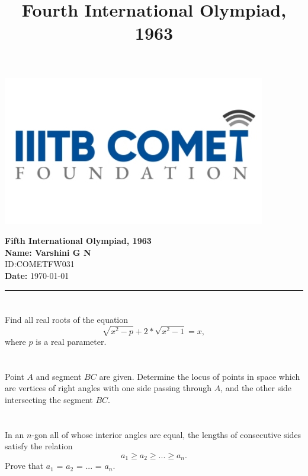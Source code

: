 \documentclass[12pt,a4paper]{article}
\begin{document}
\begin{center}
\begin{minipage}{0.2\textwidth}
  \includegraphics[width=\linewidth]{iiit_logo.png}
\end{minipage}
\hfill
\begin{minipage}{0.75\textwidth}
  \centering
  {\Large \textbf{Fifth International Olympiad, 1963}}\\[1ex]
  \textbf{Name: Varshini G N} \\[0.5ex]
  ID:COMETFW031\\
  \textbf{Date:} \today
\end{minipage}
\end{center}

\vspace{1em}
\title{Fourth International Olympiad, 1963}
\hrule
\vspace{1em}

\section{}
Find all real roots of the equation
\[
\sqrt{x^2 - p} + 2*\sqrt{x^2 -1} = x,
\]
where $p$ is a real parameter.

\section{}
Point $A$ and segment $BC$ are given. Determine the locus of points in space which are vertices of right angles with one side passing through $A$, and the other side intersecting the segment $BC$.

\section{}
In an $n$-gon all of whose interior angles are equal, the lengths of consecutive sides satisfy the relation
\[
a_1 \geq a_2 \geq ... \geq a_n.
\]
Prove that $a_1$ = $a_2$ = ... = $a_n$.
\end{document}
